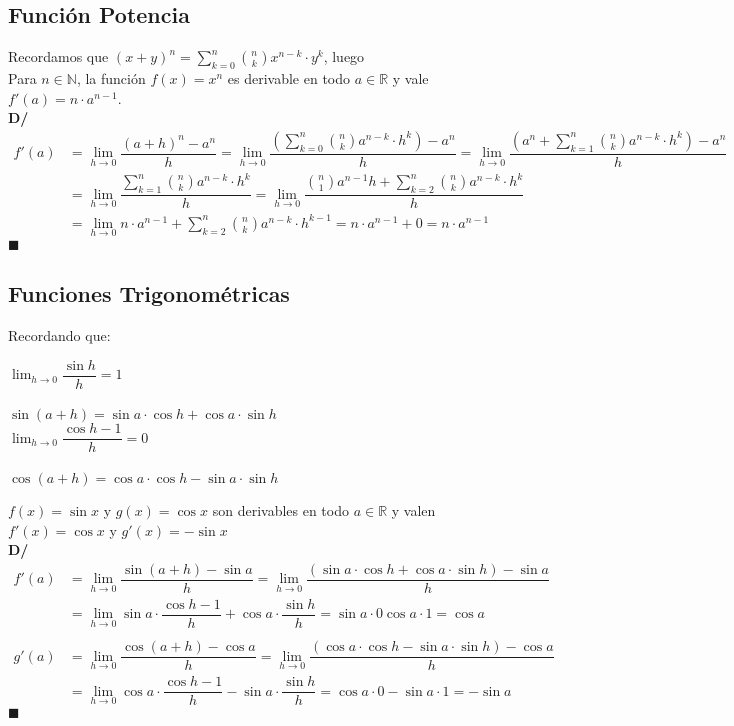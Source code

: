 \documentclass[11pt,a4paper]{article}
\newcommand*{\QEDA}{\null\nobreak\hfill\ensuremath{\blacksquare}}
\begin{document}
\subsection{Funci\'on Potencia}
\noindent Recordamos que $(x+y)^n = \displaystyle{\sum_{k=0}^n \binom{n}{k} x^{n-k}\cdot y^k}$, luego\\
Para $n \in \mathbb{N}$, la funci\'on $f(x)=x^n$ es derivable en todo $a \in \mathbb{R}$ y vale $f'(a)=n\cdot a^{n-1}$.\\
\textbf{D/ } 
\vspace{-.4cm}
\begin{align*}
f'(a) &= \lim_{h \to 0}\dfrac{(a+h)^n - a^n}{h} = \lim_{h\to 0}\dfrac{\left(\sum_{k=0}^n \binom{n}{k} a^{n-k}\cdot h^k\right) - a^n}{h} = \lim_{h\to 0}\dfrac{\left(a^n + \sum_{k=1}^n \binom{n}{k} a^{n-k}\cdot h^k\right) - a^n}{h} \\ &= \lim_{h\to 0}\dfrac{\sum_{k=1}^n \binom{n}{k} a^{n-k}\cdot h^k}{h} = \lim_{h\to 0}\dfrac{\binom{n}{1}a^{n-1}h + \sum_{k=2}^n \binom{n}{k} a^{n-k}\cdot h^k}{h} \\ &= \lim_{h\to 0}n\cdot a^{n-1} + \sum_{k=2}^n \binom{n}{k} a^{n-k}\cdot h^{k-1} = n\cdot a^{n-1} + 0 = n\cdot a^{n-1}
\end{align*} \QEDA

\subsection{Funciones Trigonom\'etricas}
\noindent Recordando que:
\begin{multicols}{2}
\indent \indent \indent \indent $\displaystyle{\lim_{h \to 0} \dfrac{\sin h}{h} = 1}$ \\  \\
$\sin(a+h) = \sin a \cdot \cos h + \cos a \cdot \sin h$ \\ 
\indent \indent \indent \indent $\displaystyle{\lim_{h \to 0} \dfrac{\cos h - 1}{h} = 0}$ \\ \\ 
$\cos(a+h) = \cos a \cdot \cos h - \sin a \cdot \sin h$
\end{multicols}
\noindent $f(x)=\sin x$ y $g(x)=\cos x$ son derivables en todo $a\in\mathbb{R}$ y valen $f'(x)=\cos x$ y $g'(x)=-\sin x$\\
\textbf{D/} \vspace{-.5cm}
\begin{align*}
f'(a) &= \displaystyle{\lim_{h \to 0} \dfrac{\sin(a+h) - \sin a}{h} = \lim_{h \to 0} \dfrac{(\sin a \cdot \cos h + \cos a \cdot \sin h) - \sin a}{h}} \\ &= \displaystyle{\lim_{h \to 0} \sin a \cdot \dfrac{\cos h - 1}{h} + \cos a \cdot \dfrac{\sin h}{h} = \sin a \cdot 0 \cos a \cdot 1} = \cos a\\ \\
g'(a) &= \displaystyle{\lim_{h \to 0} \dfrac{\cos(a+h)-\cos a}{h} = \lim_{h \to 0} \dfrac{(\cos a \cdot \cos h - \sin a \cdot \sin h)-\cos a}{h}} \\ &= \displaystyle{\lim_{h \to 0} \cos a \cdot \dfrac{\cos h - 1}{h} - \sin a \cdot \dfrac{\sin h}{h} = \cos a \cdot 0 - \sin a \cdot 1 = -\sin a}
\end{align*} \QEDA
\end{document}
